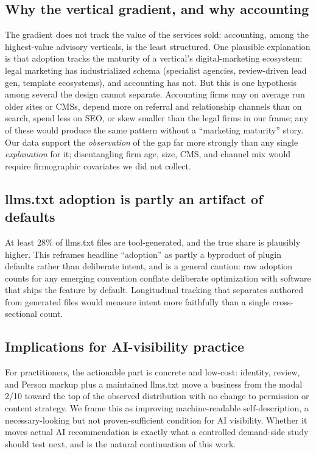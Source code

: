 \documentclass[11pt]{article}
\begin{document}
\subsection{Why the vertical gradient, and why accounting}
The gradient does not track the value of the services sold: accounting, among the highest-value
advisory verticals, is the least structured. One plausible explanation is that adoption tracks the
maturity of a vertical's digital-marketing ecosystem: legal marketing has industrialized schema
(specialist agencies, review-driven lead gen, template ecosystems), and accounting has not. But this
is one hypothesis among several the design cannot separate. Accounting firms may on average run older
sites or CMSs, depend more on referral and relationship channels than on search, spend less on SEO,
or skew smaller than the legal firms in our frame; any of these would produce the same pattern
without a ``marketing maturity'' story. Our data support the \emph{observation} of the gap far more
strongly than any single \emph{explanation} for it; disentangling firm age, size, CMS, and channel
mix would require firmographic covariates we did not collect.

\subsection{llms.txt adoption is partly an artifact of defaults}
At least 28\% of llms.txt files are tool-generated, and the true share is plausibly higher. This
reframes headline ``adoption'' as partly a byproduct of plugin defaults rather than deliberate
intent, and is a general caution: raw adoption counts for any emerging convention conflate deliberate
optimization with software that ships the feature by default. Longitudinal tracking that separates
authored from generated files would measure intent more faithfully than a single cross-sectional
count.

\subsection{Implications for AI-visibility practice}
For practitioners, the actionable part is concrete and low-cost: identity, review, and Person markup
plus a maintained llms.txt move a business from the modal 2/10 toward the top of the observed
distribution with no change to permission or content strategy. We frame this as improving
machine-readable self-description, a necessary-looking but not proven-sufficient condition for AI
visibility. Whether it moves actual AI recommendation is exactly what a controlled demand-side study
should test next, and is the natural continuation of this work.
\end{document}
